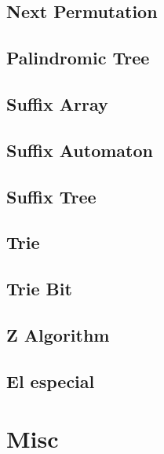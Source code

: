 \subsection{Next Permutation}
\raggedbottom
\hrulefill
\subsection{Palindromic Tree}
\raggedbottom
\hrulefill
\subsection{Suffix Array}
\raggedbottom
\hrulefill
\subsection{Suffix Automaton}
\raggedbottom
\hrulefill
\subsection{Suffix Tree}
\raggedbottom
\hrulefill
\subsection{Trie}
\raggedbottom
\hrulefill
\subsection{Trie Bit}
\raggedbottom
\hrulefill
\subsection{Z Algorithm}
\raggedbottom
\hrulefill
\subsection{El especial}
\raggedbottom
\hrulefill

\section{Misc}
